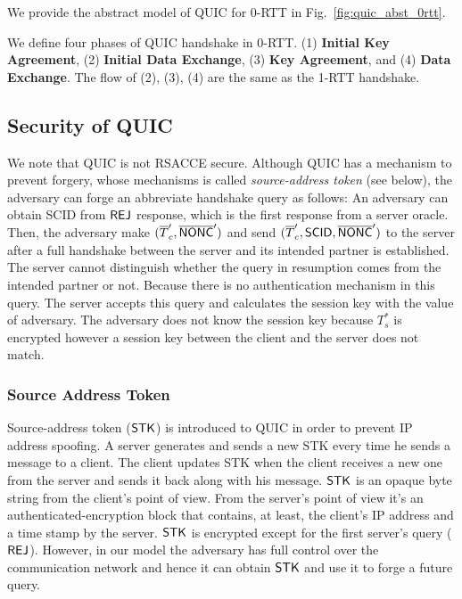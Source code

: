 We provide the abstract model of QUIC for 0-RTT in
Fig.~\ref{fig:quic_abst_0rtt}.
%

%
We define four phases of QUIC handshake in 0-RTT.
(1) \textbf{Initial Key Agreement},
(2) \textbf{Initial Data Exchange},
(3) \textbf{Key Agreement}, and
(4) \textbf{Data Exchange}.
The flow of (2), (3), (4) are the same as the 1-RTT
handshake.



\subsection{Security of QUIC} \label{sec:quic_detail}

We note that QUIC is not RSACCE secure.
Although QUIC has a mechanism to prevent forgery,
whose mechanisms is called \textit{source-address token}
(see below), the adversary can forge an abbreviate handshake
query as follows: An adversary can obtain SCID from $\mathsf{REJ}$
response, which is the first response from a server oracle.
Then, the adversary make $(\overline{T}_c^{\prime},
\overline{\mathsf{NONC}}^{\prime})$ and send $(\overline{T}_c^{\prime},
\mathsf{SCID}, \overline{\mathsf{NONC}}^{\prime})$ to the server after a
full handshake between the server and its intended partner
is established.
The server cannot distinguish whether the query in resumption
comes from the intended partner or not. Because there is no
authentication mechanism in this query. The server accepts
this query and calculates the session key with the value
of adversary.
The adversary does not know the session key because
$T_s^{\ast}$ is encrypted however a session key between the
client and the server does not match.

\subsubsection{Source Address Token} \label{sec:source_address_token}
Source-address token ($\mathsf{STK}$) is introduced to QUIC in order to
prevent IP address spoofing.
A server generates and sends a new STK every time he sends a
message to a client.
The client updates STK when the client receives a new one from
the server and sends it back along with his message.
$\mathsf{STK}$ is an opaque byte string from the client's point of view.
From the server's point of view it's an authenticated-encryption
block that contains, at least, the client's IP address and a time
stamp by the server.
$\mathsf{STK}$ is encrypted except for the first server's query ($\mathsf{REJ}$).
However, in our model the adversary has full control over the
communication network and hence it can obtain $\mathsf{STK}$ and use it to
forge a future query.